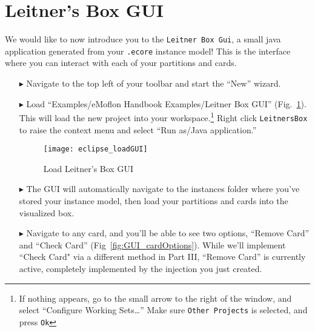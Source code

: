 \newpage
\section{Leitner's Box GUI}
\genHeader
\hypertarget{sec:LBGUI}{}

We would like to now introduce you to the \texttt{Leitner Box Gui}, a small java application generated from your \texttt{.ecore} instance model! This is the
interface where you can interact with each of your partitions and cards.

\begin{itemize}

\item[$\blacktriangleright$] Navigate to the top left of your toolbar and start the ``New'' wizard.

\item[$\blacktriangleright$] Load ``Examples/eMoflon Handbook Examples/Leitner Box GUI'' (Fig.~\ref{fig:GUI_load}). This will load the new project into
your workspace.\footnote{If nothing appears, go to the small arrow to the right of the window, and select ``Configure Working Sets\ldots'' Make sure
\texttt{Other Projects} is selected, and press \texttt{Ok}} Right click \texttt{LeitnersBox} to raise the context menu and select ``Run as/Java application.''

\begin{figure}[htbp]
    \centering
    \texttt{[image: eclipse\_loadGUI]}
    \caption{Load Leitner's Box GUI}
    \label{fig:GUI_load}
\end{figure}

\clearpage

\item[$\blacktriangleright$] The GUI will automatically navigate to the instances folder where you've stored your instance model, then load your partitions and
cards into the visualized box.

\vspace{1cm}

\item[$\blacktriangleright$] Navigate to any card, and you'll be able to see two options, ``Remove Card'' and ``Check Card'' (Fig~\ref{fig:GUI_cardOptions}).
While we'll implement ``Check Card" via a different method in Part III, ``Remove Card'' is currently active, completely implemented by the injection you just created.

\vspace{1cm}


\end{itemize}
